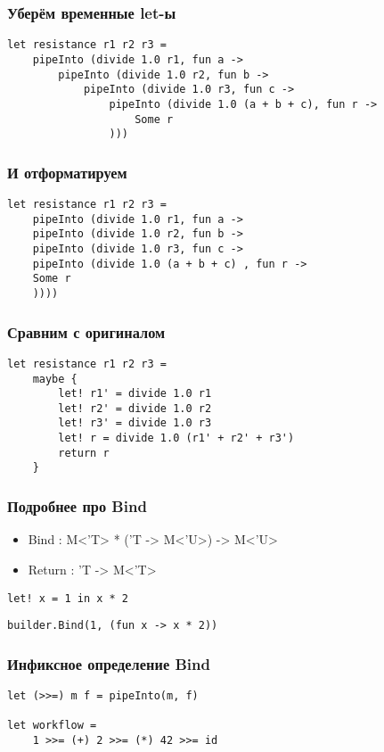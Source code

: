 \documentclass[xetex,mathserif,serif]{beamer}
\begin{document}
    \begin{frame}[fragile]
        \frametitle{Уберём временные let-ы}
        \begin{verbatim}
let resistance r1 r2 r3 = 
    pipeInto (divide 1.0 r1, fun a ->
        pipeInto (divide 1.0 r2, fun b ->
            pipeInto (divide 1.0 r3, fun c ->
                pipeInto (divide 1.0 (a + b + c), fun r ->
                    Some r
                )))
        \end{verbatim}
    \end{frame}

    \begin{frame}[fragile]
        \frametitle{И отформатируем}
        \begin{verbatim}
let resistance r1 r2 r3 = 
    pipeInto (divide 1.0 r1, fun a ->
    pipeInto (divide 1.0 r2, fun b ->
    pipeInto (divide 1.0 r3, fun c ->
    pipeInto (divide 1.0 (a + b + c) , fun r ->
    Some r
    ))))
        \end{verbatim}
    \end{frame}

    \begin{frame}[fragile]
        \frametitle{Сравним с оригиналом}
        \begin{verbatim}
let resistance r1 r2 r3 = 
    maybe {
        let! r1' = divide 1.0 r1
        let! r2' = divide 1.0 r2
        let! r3' = divide 1.0 r3
        let! r = divide 1.0 (r1' + r2' + r3')
        return r
    }
        \end{verbatim}
    \end{frame}

    \begin{frame}[fragile]
        \frametitle{Подробнее про Bind}
        \begin{itemize}
            \item Bind : M<'T> * ('T -> M<'U>) -> M<'U>
            \item Return : 'T -> M<'T>
        \end{itemize}
        \begin{verbatim}
let! x = 1 in x * 2
        \end{verbatim}
        \begin{verbatim}
builder.Bind(1, (fun x -> x * 2))
        \end{verbatim}
    \end{frame}

    \begin{frame}[fragile]
        \frametitle{Инфиксное определение Bind}
        \begin{verbatim}
let (>>=) m f = pipeInto(m, f)

let workflow = 
    1 >>= (+) 2 >>= (*) 42 >>= id
        \end{verbatim}
    \end{frame}
\end{document}
